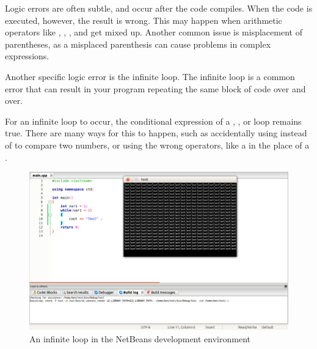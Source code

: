 
Logic errors are often subtle, and occur after the code compiles. 
When the code is executed, however, the result is wrong. 
This may happen when arithmetic operators like \Code{+}, \Code{-}, \Code{*}, and \Code{/} get mixed up. 
Another common issue is misplacement of parentheses, as a misplaced parenthesis can cause problems in complex expressions. 


Another specific logic error is the infinite loop. 
The infinite loop is a common error that can result in your program repeating the same block of code over and over. 

For an infinite loop to occur, the conditional expression of a , , or  loop remains true. 
There are many ways for this to happen, such as accidentally using \Code{=} instead of \Code{==} to compare two numbers, or using the wrong operators, like a \Code{>} in the place of a \Code{<}.

\begin{figure}[tbh]
  \centering
  \includegraphics[width=\textwidth]{diagrams/fig-netbeans-infinite-loop.pdf}
  \caption{An infinite loop in the NetBeans development environment} \label{fig-netbeans-infinite-loop} 
\end{figure}


